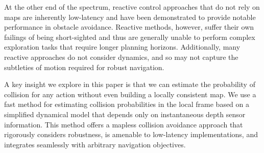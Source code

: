 \documentclass{llncs}
\begin{document}
At the other end of the spectrum, reactive control approaches that do not rely on maps are inherently low-latency and have been demonstrated to provide notable performance in obstacle avoidance.  Reactive methods, however, suffer their own failings of being short-sighted and thus are generally unable to perform complex exploration tasks that require longer planning horizons.  Additionally, many reactive approaches do not consider dynamics, and so may not capture the subtleties of motion required for robust navigation.

A key insight we explore in this paper is that we can estimate the probability of collision for any action without even building a locally consistent map.  We use a fast method for estimating collision probabilities in the local frame based on a simplified dynamical model that depends only on instantaneous depth sensor information. This method offers a mapless collision avoidance approach that rigorously considers robustness, is amenable to low-latency implementations, and integrates seamlessly with arbitrary navigation objectives.  





%
%
\end{document}
